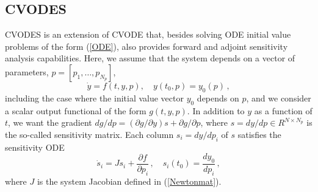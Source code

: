 \subsection{CVODES}\label{ss:cvodes}

CVODES is an extension of CVODE that, besides solving ODE initial
value problems of the form (\ref{ODE}), also provides forward and
adjoint sensitivity analysis capabilities.
%
Here, we assume that the system depends on a vector of parameters,
$p = [p_1,\ldots,p_{N_p}]$,
\begin{equation}\label{e:ODE_with_p}
\dot{y} = f(t,y,p), \quad y(t_0,p) = y_0(p) \, ,
\end{equation}
including the case where the initial value vector $y_0$ depends on $p$,
and we consider a scalar output functional of the form $g(t,y,p)$.
%
In addition to $y$ as a function of $t$, we want the gradient
$d g / d p  = ({\partial g}/{\partial y}) s + {\partial g}/{\partial p}$,
where $s = dy/dp \in R^{N \times N_p}$ is the so-called sensitivity matrix.
%
Each column $s_i = d y / d p_i$ of $s$ satisfies the sensitivity ODE
\begin{equation}\label{e:fwdODE}
\dot{s}_i = J s_i + \frac{\partial f}{\partial p_i} \, ,
\quad s_i(t_0) = \frac{d y_0}{d p_i} \, ,
\end{equation}
where $J$ is the system Jacobian defined in (\ref{Newtonmat}).

